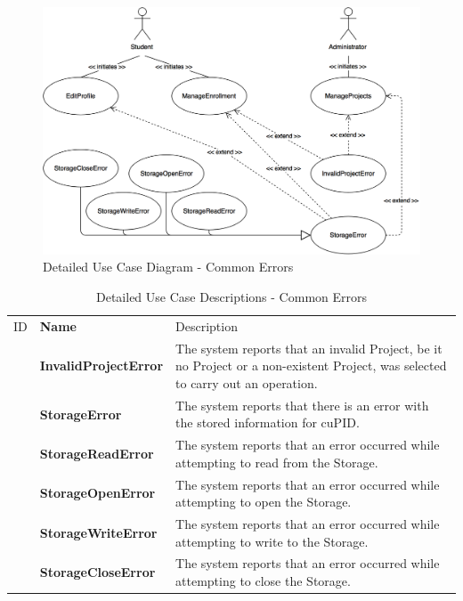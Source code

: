 \documentclass[12pt,letterpaper]{article}
\begin{document}
\begin{figure}[H]
	\centering{}
	\includegraphics[scale=0.3]{imgs/detailed-common-error-use-case-diagram.png}
	\caption{Detailed Use Case Diagram - Common Errors}
\end{figure}

\begin{table}[H]
	\caption{Detailed Use Case Descriptions - Common Errors}
	\vspace{1em}
	\begin{tabu} to 
	    \tableheader{}ID & Name & Description\\
   		\invalidprojecterror{} & InvalidProjectError & The system reports that an invalid Project, be it no Project or a non-existent Project, was selected to carry out an operation.\\
		\storageerror{} & StorageError &  The system reports that there is an error with the stored information for cuPID.\\
		\storagereaderror{} & StorageReadError & The system reports that an error occurred while attempting to read from the Storage.\\
		\storageopenerror{} & StorageOpenError & The system reports that an error occurred while attempting to open the Storage.\\
		\storagewriteerror{} & StorageWriteError & The system reports that an error occurred while attempting to write to the Storage.\\
		\storagecloseerror{} & StorageCloseError & The system reports that an error occurred while attempting to close the Storage.\\
	\end{tabu}
\end{table}
\end{document}
